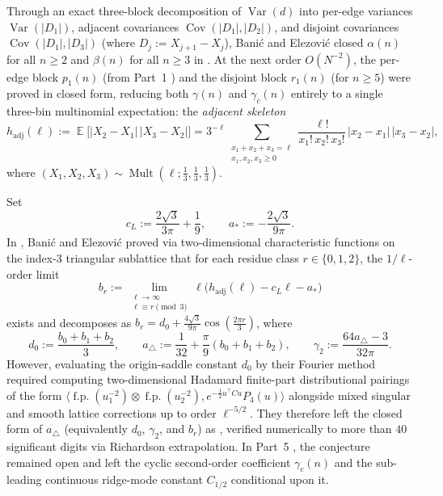 \documentclass[11pt,a4paper]{article}
\numberwithin{equation}{section}
\theoremstyle{plain}
\theoremstyle{definition}
\theoremstyle{remark}
\DeclareMathOperator{\E}{\mathbb{E}}
\DeclareMathOperator{\Var}{Var}
\DeclareMathOperator{\Cov}{Cov}
\DeclareMathOperator{\Mult}{Mult}
\newcommand{\hadj}{h_{\mathrm{adj}}}
\newcommand{\tri}{a_{\triangle}}
\begin{document}
Through an exact three-block decomposition of $\Var(d)$ into per-edge variances $\Var(|D_1|)$, adjacent covariances $\Cov(|D_1|,|D_2|)$, and disjoint covariances $\Cov(|D_1|,|D_3|)$ (where $D_j:=X_{j+1}-X_j$), Bani\'c and Elezovi\'c closed $\alpha(n)$ for all $n\ge 2$ and $\beta(n)$ for all $n\ge 3$ in \cite{banic_elezovic_p2}. At the next order $O(N^{-2})$, the per-edge block $p_1(n)$ (from Part~1 \cite{banic_elezovic_p1}) and the disjoint block $r_1(n)$ (for $n\ge 5$) were proved in closed form, reducing both $\gamma(n)$ and $\gamma_c(n)$ entirely to a single three-bin multinomial expectation: the \emph{adjacent skeleton}
\begin{equation}\label{eq:hadj-def}
  \hadj(\ell)
  := \E\bigl[|X_2-X_1|\,|X_3-X_2|\bigr]
  = 3^{-\ell}\sum_{\substack{x_1+x_2+x_3=\ell\\ x_1,x_2,x_3\ge 0}}
    \frac{\ell!}{x_1!\,x_2!\,x_3!}\,|x_2-x_1|\,|x_3-x_2|,
\end{equation}
where $(X_1,X_2,X_3)\sim\Mult(\ell;\tfrac{1}{3},\tfrac{1}{3},\tfrac{1}{3})$.

Set
\begin{equation}\label{eq:cL-aStar}
  c_L := \frac{2\sqrt{3}}{3\pi} + \frac{1}{9},
  \qquad
  a_* := -\frac{2\sqrt{3}}{9\pi}.
\end{equation}
In \cite[Lemma~7.3]{banic_elezovic_p2}, Bani\'c and Elezovi\'c proved via two-dimensional characteristic functions on the index-$3$ triangular sublattice that for each residue class $r\in\{0,1,2\}$, the $1/\ell$-order limit
\begin{equation}\label{eq:br-def}
  b_r := \lim_{\substack{\ell\to\infty\\\ell\equiv r\pmod 3}} \ell\bigl(\hadj(\ell) - c_L\ell - a_*\bigr)
\end{equation}
exists and decomposes as $b_r = d_0 + \frac{4\sqrt{3}}{9\pi}\cos(\frac{2\pi r}{3})$, where
\begin{equation}\label{eq:d0-atri-gamma2-def}
  d_0 := \frac{b_0+b_1+b_2}{3},
  \qquad
  \tri := \frac{1}{32} + \frac{\pi}{9}(b_0+b_1+b_2),
  \qquad
  \gamma_2 := \frac{64\tri - 3}{32\pi}.
\end{equation}
However, evaluating the origin-saddle constant $d_0$ by their Fourier method required computing two-dimensional Hadamard finite-part distributional pairings \cite{estrada_kanwal} of the form $\langle \operatorname{f.p.}(u_1^{-2})\otimes\operatorname{f.p.}(u_2^{-2}), e^{-\frac{1}{2}u^\top C u} P_4(u)\rangle$ alongside mixed singular and smooth lattice corrections up to order $\ell^{-5/2}$. They therefore left the closed form of $\tri$ (equivalently $d_0$, $\gamma_2$, and $b_r$) as \cite[Conjecture~7.7]{banic_elezovic_p2}, verified numerically to more than $40$ significant digits via Richardson extrapolation. In Part~5 \cite[Remarks~3.11, 3.13, and 4.3]{banic_elezovic_p5}, the conjecture remained open and left the cyclic second-order coefficient $\gamma_c(n)$ and the sub-leading continuous ridge-mode constant $C_{1/2}$ conditional upon it.
\end{document}
